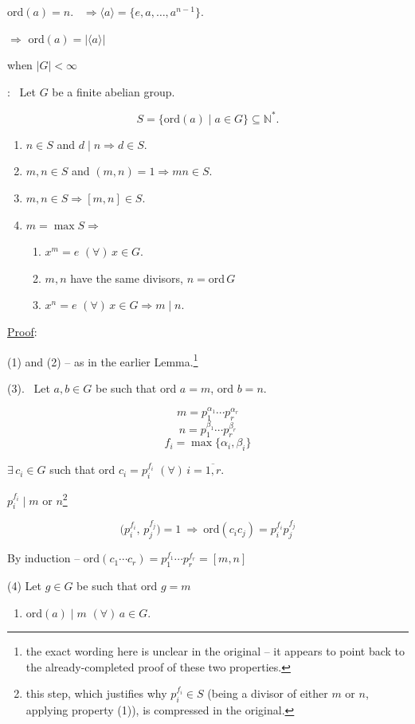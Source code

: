 \documentclass[12pt]{article}
\begin{document}
\noindent ord$(a)=n$. \ $\Rightarrow \langle a\rangle = \{e,a,\ldots,a^{n-1}\}$.

\noindent $\Rightarrow$ ord$(a) = |\langle a\rangle|$

\noindent when $|G|<\infty$

\bigskip
\noindent{}: \ Let $G$ be a finite abelian group.

\[
S=\{\text{ord}(a) \mid a\in G\} \subseteq \mathbb{N}^*.
\]

\begin{enumerate}
\item[(1)] $n\in S$ and $d\mid n \Rightarrow d\in S$.
\item[(2)] $m,n\in S$ and $(m,n)=1 \Rightarrow mn\in S$.
\item[(3)] $m,n\in S \Rightarrow [m,n]\in S$.
\item[(4)] $m=\max S \Rightarrow$
\begin{enumerate}
\item[(a)] $x^m=e$ $(\forall)\,x\in G$.
\item[(b)] $m,n$ have the same divisors, $n=$ord$\,G$
\item[(c)] $x^n=e$ $(\forall)\,x\in G \Rightarrow m\mid n$.
\end{enumerate}
\end{enumerate}

\bigskip
\noindent\underline{Proof}:

\noindent (1) and (2) -- as in the earlier Lemma.\footnote{the exact wording here is unclear in the original -- it appears to point back to the already-completed proof of these two properties.}

\bigskip
\noindent (3). \ Let $a,b\in G$ be such that ord $a=m$, ord $b=n$.

\[
m=p_1^{\alpha_1}\cdots p_r^{\alpha_r}
\]
\[
n=p_1^{\beta_1}\cdots p_r^{\beta_r}
\]
\[
f_i=\max\{\alpha_i,\beta_i\}
\]

\noindent $\exists\, c_i\in G$ such that ord $c_i=p_i^{f_i}$ $(\forall)\,i=\overline{1,r}$.

\bigskip
\noindent $p_i^{f_i}\mid m$ or $n$\footnote{this step, which justifies why $p_i^{f_i}\in S$ (being a divisor of either $m$ or $n$, applying property (1)), is compressed in the original.}

\[
\big(p_i^{f_i},\,p_j^{f_j}\big)=1 \ \Rightarrow \ \text{ord}(c_ic_j) = p_i^{f_i}p_j^{f_j}
\]

\bigskip
\noindent By induction -- ord$(c_1\cdots c_r) = p_1^{f_1}\cdots p_r^{f_r} = [m,n]$

\bigskip
\noindent (4) Let $g\in G$ be such that ord $g=m$

\begin{enumerate}
\item[(a)] ord$(a)\mid m$ $(\forall)\,a\in G$.
\end{enumerate}
\end{document}
